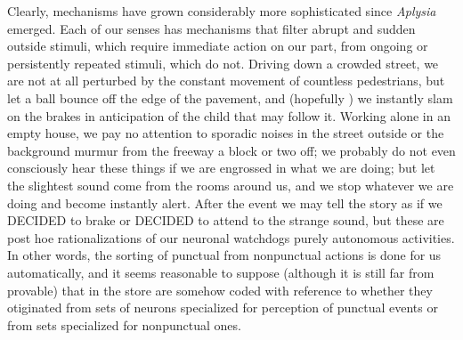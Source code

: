 Clearly,  mechanisms have grown considerably more sophisticated since \textit{Aplysia} emerged. Each of our senses has mechanisms that filter abrupt and sudden outside stimuli, which require immediate action on our part, from ongoing or persistently repeated stimuli, which do not. Driving down a crowded street, we are not at all perturbed by the constant movement of countless pedestrians, but let a ball bounce off the edge of the pavement, and (hopefully ) we instantly slam on the brakes in anticipation of the child that may follow it. Working alone in an empty house, we pay no attention to sporadic noises in the street outside or the background murmur from the freeway a block or two off; we probably do not even consciously hear these things if we are engrossed in what we are doing; but let the slightest sound come from the rooms around us, and we stop whatever we are doing and become instantly alert. After the event we may tell the story as if we DECIDED to brake or DECIDED to attend to the strange sound, but these are post hoe rationalizations of our neuronal watchdogs purely autono\-mous activities. In other words, the sorting of punctual from non\-punctual actions is done for us automatically, and it seems reasonable to suppose (although it is still far from provable) that  in the  store are somehow coded with reference to whether they otiginated from sets of neurons specialized for perception of punctual events or from sets specialized for nonpunctual ones.

